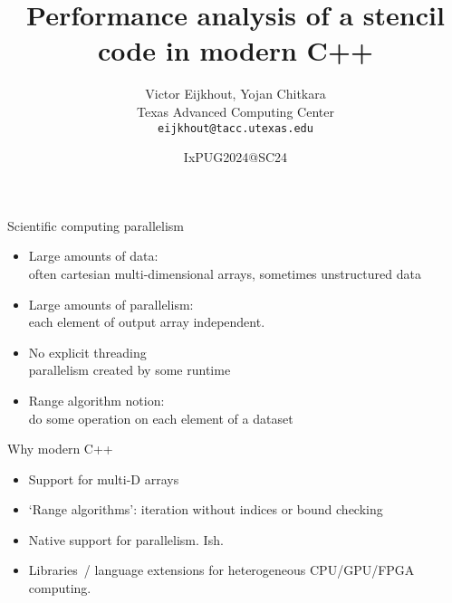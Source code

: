 \documentclass[10pt]{beamer}
\begin{document}


\author[Eijkhout]{Victor Eijkhout, Yojan Chitkara\\
  Texas Advanced Computing Center\\
  \texttt{eijkhout@tacc.utexas.edu}
}
\date{IxPUG2024@SC24}
\title{Performance analysis of a stencil code in modern C++}
\maketitle

\begin{numberedframe}{Scientific computing parallelism}
  \begin{itemize}
  \item Large amounts of data: \\
    often cartesian multi-dimensional arrays, sometimes unstructured data
  \item Large amounts of parallelism:\\
    each element of output array independent.
  \item No explicit threading\\
    parallelism created by some runtime
  \item Range algorithm notion:\\
    do some operation on each element of a dataset
  \end{itemize}
\end{numberedframe}

\begin{numberedframe}{Why modern C++}
  \begin{itemize}
  \item Support for multi-D arrays
  \item `Range algorithms': iteration without indices or bound checking
  \item Native support for parallelism. Ish.
  \item Libraries~/ language extensions for heterogeneous CPU/GPU/FPGA computing.
  \end{itemize}
\end{numberedframe}

\end{document}
